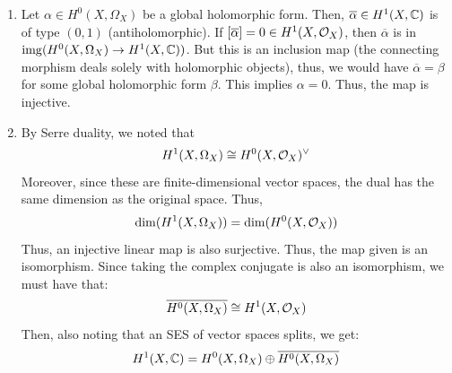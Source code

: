 \documentclass[12pt]{article}
\begin{document}
\begin{solution}
\begin{enumerate}
        \item Let $\alpha \in H^0(X, \Omega_X)$ be a global holomorphic form. Then, $\overline{\alpha} \in H^1(X, \mathbb C)$ is of type $(0, 1)$ (antiholomorphic). If $[\overline{\alpha}] = 0 \in H^1(X, \mathcal{O}_X)$, then $\overline{\alpha}$ is in $\operatorname{img}(H^0(X, \Omega_X) \to H^1(X, \mathbb C))$. But this is an inclusion map (the connecting morphism deals solely with holomorphic objects), thus, we would have $\overline{\alpha} = \beta$ for some global holomorphic form $\beta$. This implies $\alpha = 0$. Thus, the map is injective. 
        \item By Serre duality, we noted that
        \[ H^1(X, \Omega_X) \cong H^0(X, \mathcal{O}_X)^\vee\]
        Moreover, since these are finite-dimensional vector spaces, the dual has the same dimension as the original space. Thus, 
        \[ \dim(H^1(X, \Omega_X)) = \dim(H^0(X, \mathcal{O}_X))\]
        Thus, an injective linear map is also surjective. Thus, the map given is an isomorphism. Since taking the complex conjugate is also an isomorphism, we must have that: 
        \[ \overline{H^0(X, \Omega_X)} \cong H^1(X, \mathcal{O}_X)\]
        Then, also noting that an SES of vector spaces splits, we get: 
        \[ H^1(X, \mathbb C) = H^0(X, \Omega_X) \oplus \overline{H^0(X, \Omega_X)}\]
    \end{enumerate}
\end{solution}
\newpage
\end{document}
